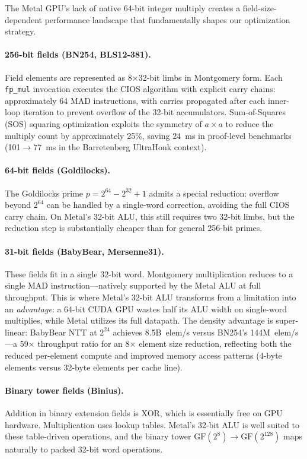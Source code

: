 \documentclass[letterpaper,twocolumn,10pt]{article}
\begin{document}
The Metal GPU's lack of native 64-bit integer multiply creates a
field-size-dependent performance landscape that fundamentally shapes our
optimization strategy.

\paragraph{256-bit fields (BN254, BLS12-381).} Field elements are
represented as 8$\times$32-bit limbs in Montgomery form. Each
\texttt{fp\_mul} invocation executes the CIOS algorithm with explicit carry
chains: approximately 64 MAD instructions, with carries propagated after
each inner-loop iteration to prevent overflow of the 32-bit accumulators.
Sum-of-Squares (SOS) squaring optimization exploits the symmetry of
$a \times a$ to reduce the multiply count by approximately 25\%, saving
24~ms in proof-level benchmarks (101$\to$77~ms in the Barretenberg
UltraHonk context).

\paragraph{64-bit fields (Goldilocks).} The Goldilocks prime
$p = 2^{64} - 2^{32} + 1$ admits a special reduction: overflow beyond
$2^{64}$ can be handled by a single-word correction, avoiding the full
CIOS carry chain. On Metal's 32-bit ALU, this still requires two 32-bit
limbs, but the reduction step is substantially cheaper than for general
256-bit primes.

\paragraph{31-bit fields (BabyBear, Mersenne31).} These fields fit in a
single 32-bit word. Montgomery multiplication reduces to a single MAD
instruction---natively supported by the Metal ALU at full throughput. This
is where Metal's 32-bit ALU transforms from a limitation into an
\emph{advantage}: a 64-bit CUDA GPU wastes half its ALU width on
single-word multiplies, while Metal utilizes its full datapath. The
density advantage is super-linear: BabyBear NTT at $2^{24}$ achieves
8.5B~elem/s versus BN254's 144M~elem/s---a 59$\times$ throughput ratio
for an 8$\times$ element size reduction, reflecting both the reduced
per-element compute and improved memory access patterns (4-byte elements
versus 32-byte elements per cache line).

\paragraph{Binary tower fields (Binius).} Addition in binary extension
fields is XOR, which is essentially free on GPU hardware. Multiplication
uses lookup tables. Metal's 32-bit ALU is well suited to these
table-driven operations, and the binary tower
$\text{GF}(2^8) \to \text{GF}(2^{128})$ maps naturally to
packed 32-bit word operations.
\end{document}
